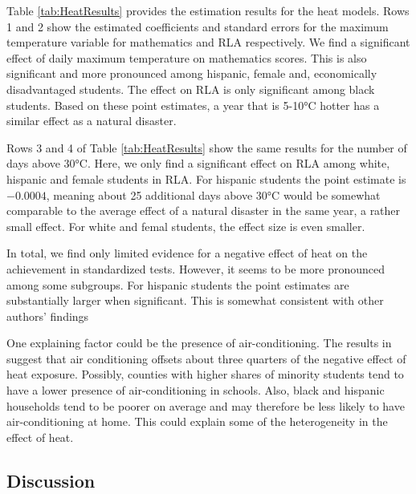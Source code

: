 Table \ref{tab:HeatResults} provides the estimation results for the heat models. Rows 1 and 2 show the estimated coefficients and standard errors for the maximum temperature variable for mathematics and RLA respectively. We find a significant effect of daily maximum temperature on mathematics scores. This is also significant and more pronounced among hispanic, female and, economically disadvantaged students. The effect on RLA is only significant among black students. Based on these point estimates, a year that is 5-10°C hotter has a similar effect as a natural disaster.



Rows 3 and 4 of Table \ref{tab:HeatResults} show the same results for the number of days above 30°C. Here, we only find a significant effect on RLA among white, hispanic and female students in RLA. For hispanic students the point estimate is $-0.0004$, meaning about 25 additional days above 30°C would be somewhat comparable to the average effect of a natural disaster in the same year, a rather small effect. For white and femal students, the effect size is even smaller.

In total, we find only limited evidence for a negative effect of heat on the achievement in standardized tests. However, it seems to be more pronounced among some subgroups. For hispanic students the point estimates are substantially larger when significant. This is somewhat consistent with other authors' findings \citep[for example][]{Goodman_2020}

One explaining factor could be the presence of air-conditioning. The results in \cite{Goodman_2020} suggest that air conditioning offsets about three quarters of the negative effect of heat exposure. Possibly, counties with higher shares of minority students tend to have a lower presence of air-conditioning in schools. Also, black and hispanic households tend to be poorer on average and may therefore be less likely to have air-conditioning at home. This could explain some of the heterogeneity in the effect of heat.

\subsection{Discussion}

